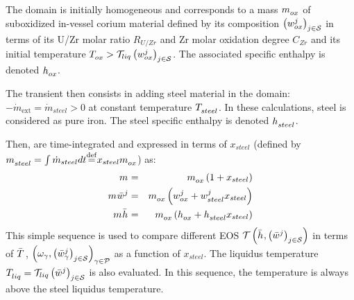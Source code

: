 The domain is initially homogeneous and corresponds to a mass $\mass{ox}$ of suboxidized in-vessel corium material defined by its composition $\left(\massFraction[j]{ox}\right)_{j\in \speciesSet}$ in terms of its U/Zr molar ratio $R_{U/Zr}$ and Zr molar oxidation degree $C_{Zr}$ and its initial temperature $\temperature{ox} > \Mc{T}_{liq}\left(\massFraction[j]{ox}\right)_{j\in \speciesSet}$. The associated specific enthalpy is denoted $\massEnthalpy{ox}$.

The transient then consists in adding steel material in the domain: $- \dot{m}_{\textrm{ext}} = \dot{m}_{steel} >0$ at constant temperature $\temperature{steel}$. In these calculations, steel is considered as pure iron. The steel specific enthalpy is denoted $\massEnthalpy{steel}$.

Then,  are time-integrated and expressed in terms of $x_{steel}$ (defined by $\mass{steel} = \int \dot{m}_{steel} dt {\buildrel\rm def\over=} x_{steel}\mass{ox}$) as:
\begin{eqnarray}
 \mass{} &=& \mass{ox} \left(1 + x_{steel}\right) \\
 \mass{} \avMassFraction[j]{} &=& \mass{ox} \left(\massFraction[j]{ox} + \massFraction[j]{steel} x_{steel}\right) \\
 \mass{} \avMassEnthalpy{} &=& \mass{ox} \left(\massEnthalpy{ox} + \massEnthalpy{steel} x_{steel}\right)
\end{eqnarray}
This simple sequence is used to compare different EOS $\Mc{T}\left(\avMassEnthalpy{}, \left(\avMassFraction[j]{}\right)_{j\in \speciesSet}\right)$ in terms of $\avTemperature{}$, $\left(\omega_\gamma, \left(\avMassFraction[j]{\gamma}\right)_{j\in \speciesSet}\right)_{\gamma \in \phaseSet}$ as a function of $x_{steel}$. The liquidus temperature $\temperature{liq} = \Mc{T}_{liq}\left(\avMassFraction[j]{}\right)_{j\in \speciesSet}$ is also evaluated. In this sequence, the temperature is always above the steel liquidus temperature. 


